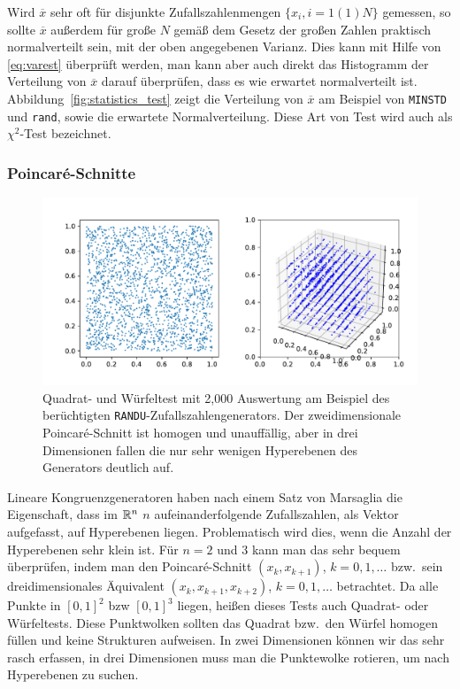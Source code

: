 Wird $\overline{x}$ sehr oft für disjunkte Zufallszahlenmengen $\{x_i,
i=1(1)N\}$ gemessen, so sollte $\overline{x}$ außerdem für große $N$
gemäß dem Gesetz der großen Zahlen praktisch normalverteilt sein, mit
der oben angegebenen Varianz. Dies kann mit Hilfe von
\eqref{eq:varest} überprüft werden, man kann aber auch direkt das
Histogramm der Verteilung von $\overline{x}$ darauf überprüfen, dass es
wie erwartet normalverteilt ist.  Abbildung~\ref{fig:statistics_test}
zeigt die Verteilung von $\overline{x}$ am Beispiel von
\texttt{MINSTD} und \texttt{rand}, sowie die erwartete
Normalverteilung.  Diese Art von Test wird auch als $\chi^2$-Test
bezeichnet.

\subsubsection{Poincar\'e-Schnitte}

\begin{figure}
  \centering
  \includegraphics[width=\textwidth]{plots/optical_test}
  \caption{Quadrat- und Würfeltest mit 2,000 Auswertung am Beispiel
    des berüchtigten \texttt{RANDU}-Zufallszahlengenerators. Der
    zweidimensionale Poincar\'e-Schnitt ist homogen und unauffällig,
    aber in drei Dimensionen fallen die nur sehr wenigen Hyperebenen
    des Generators deutlich auf.}
  \label{fig:optical_test}
\end{figure}

Lineare Kongruenzgeneratoren haben nach einem Satz von Marsaglia die
Eigenschaft, dass im $\mathbb{R}^n$ $n$ aufeinanderfolgende Zufallszahlen,
als Vektor aufgefasst, auf Hyperebenen liegen. Problematisch wird
dies, wenn die Anzahl der Hyperebenen sehr klein ist. Für $n=2$ und
$3$ kann man das sehr bequem überprüfen, indem man den
Poincar\'e-Schnitt $(x_k, x_{k+1})$, $k=0,1,\ldots$ bzw.\ sein
dreidimensionales Äquivalent $(x_k, x_{k+1}, x_{k+2})$, $k=0,1,\ldots$
betrachtet. Da alle Punkte in $[0,1]^2$ bzw $[0,1]^3$ liegen, heißen
dieses Tests auch Quadrat- oder Würfeltests. Diese Punktwolken sollten
das Quadrat bzw.\ den Würfel homogen füllen und keine Strukturen
aufweisen. In zwei Dimensionen können wir das sehr rasch erfassen, in
drei Dimensionen muss man die Punktewolke rotieren, um nach
Hyperebenen zu suchen.

